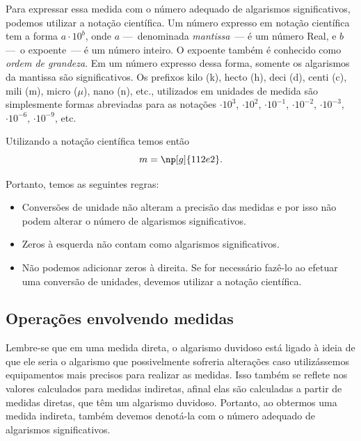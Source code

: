 \begin{enumerate}
Para expressar essa medida com o número adequado de algarismos significativos, podemos utilizar a notação científica. Um número expresso em notação científica tem a forma $a \cdot 10^b$, onde $a$ ---~denominada \emph{mantissa}~--- é um número Real, e $b$ ---~o expoente~--- é um número inteiro. O expoente também é conhecido como \emph{ordem de grandeza}. Em um número expresso dessa forma, somente os algarismos da mantissa são significativos. Os prefixos kilo (k), hecto (h), deci (d), centi (c), mili (m), micro ($\mu$), nano (n), etc., utilizados em unidades de medida são simplesmente formas abreviadas para as notações $\cdot 10^{3}$, $\cdot 10^{2}$, $\cdot 10^{-1}$, $\cdot 10^{-2}$, $\cdot 10^{-3}$, $\cdot 10^{-6}$, $\cdot 10^{-9}$, etc.

Utilizando a notação científica temos então
\begin{equation}
	m = \np[g]{112e2}.
\end{equation}
\end{enumerate}

Portanto, temos as seguintes regras:
\begin{itemize}
	\item Conversões de unidade não alteram a precisão das medidas e por isso não podem alterar o número de algarismos significativos.
	\item Zeros à esquerda não contam como algarismos significativos.
	\item Não podemos adicionar zeros à direita. Se for necessário fazê-lo ao efetuar uma conversão de unidades, devemos utilizar a notação científica.
\end{itemize}

\subsection{Operações envolvendo medidas}

Lembre-se que em uma medida direta, o algarismo duvidoso está ligado à ideia de que ele seria o algarismo que possivelmente sofreria alterações caso utilizássemos equipamentos mais precisos para realizar as medidas. Isso também se reflete nos valores calculados para medidas indiretas, afinal elas são calculadas a partir de medidas diretas, que têm um algarismo duvidoso. Portanto, ao obtermos uma medida indireta, também devemos denotá-la com o número adequado de algarismos significativos.

